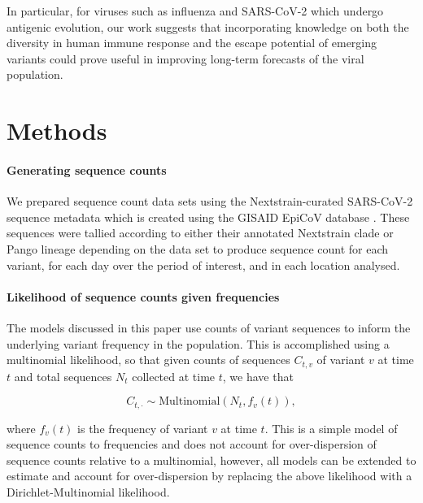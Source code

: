 \documentclass[12pt,oneside,letterpaper]{article}
\begin{document}
In particular, for viruses such as influenza and SARS-CoV-2 which undergo antigenic evolution, our work suggests that incorporating knowledge on both the diversity in human immune response and the escape potential of emerging variants could prove useful in improving long-term forecasts of the viral population.


\section*{Methods}

\paragraph{Generating sequence counts}%

We prepared sequence count data sets using the Nextstrain-curated SARS-CoV-2 sequence metadata \cite{Hadfield2018} which is created using the GISAID EpiCoV database \cite{khare2021gisaid}.
These sequences were tallied according to either their annotated Nextstrain clade or Pango lineage depending on the data set to produce sequence count for each variant, for each day over the period of interest, and in each location analysed.

\cite{aksamentov2021nextclade}

\paragraph{Likelihood of sequence counts given frequencies}

The models discussed in this paper use counts of variant sequences to inform the underlying variant frequency in the population.
This is accomplished using a multinomial likelihood, so that given counts of sequences $C_{t,v}$ of variant $v$ at time $t$ and total sequences $N_{t}$ collected at time $t$, we have that

\begin{equation*}
    C_{t, \cdot} \sim \text{Multinomial}(N_{t}, f_{v}(t)),
\end{equation*}

where $f_{v}(t)$ is the frequency of variant $v$ at time $t$.
This is a simple model of sequence counts to frequencies and does not account for over-dispersion of sequence counts relative to a multinomial, however, all models can be extended to estimate and account for over-dispersion by replacing the above likelihood with a Dirichlet-Multinomial likelihood.
\end{document}
